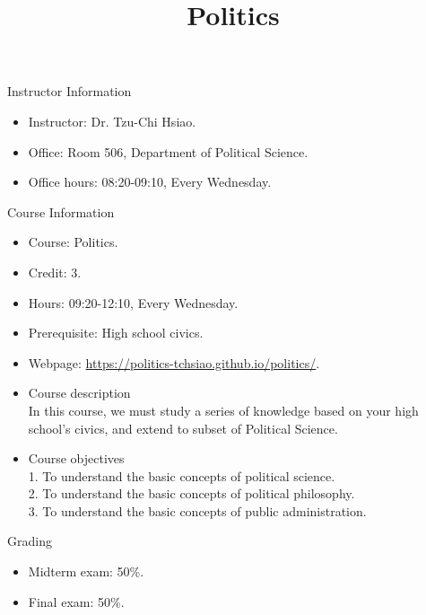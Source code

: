 \documentclass{article}
\title{\fontsize{16pt}{16pt}\selectfont Politics}
\author{}
\date{}
\begin{document}
\maketitle
\fontsize{14pt}{14pt}\selectfont
\begin{flushleft}
Instructor Information
\end{flushleft}
\begin{itemize}
\item Instructor: Dr. Tzu-Chi Hsiao. \\
\item Office: Room 506, Department of Political Science. \\
\item Office hours: 08:20-09:10, Every Wednesday. \\
\end{itemize}
Course Information \\
\begin{itemize}
\item Course: Politics. \\
\item Credit: 3. \\
\item Hours: 09:20-12:10, Every Wednesday. \\
\item Prerequisite: High school civics. \\
\item Webpage: \href{https://politics-tchsiao.github.io/politics/}{https://politics-tchsiao.github.io/politics/}. \\
\item Course description \\
In this course, we must study a series of knowledge based on your high school's civics, and extend to subset of Political Science. \\ 
\item Course objectives \\
1. To understand the basic concepts of political science. \\
2. To understand the basic concepts of political philosophy. \\
3. To understand the basic concepts of public administration. \\
\end{itemize}
\newpage
\begin{flushleft}
Grading \\
\end{flushleft}
\begin{itemize}
\item Midterm exam: 50\%. \\
\item Final exam: 50\%. \\
\end{itemize}
\end{document}
